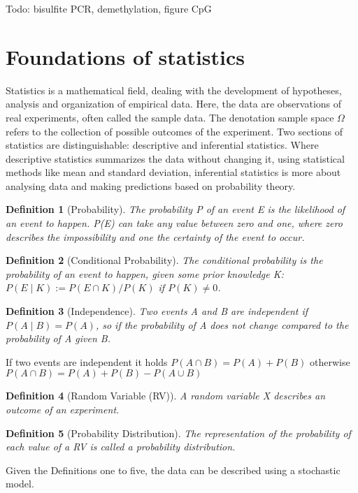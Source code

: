 Todo: bisulfite PCR, demethylation, figure CpG

\section{Foundations of statistics} 
\label{section:statistics}
Statistics is a mathematical field, dealing with the development of hypotheses, analysis and organization of empirical data. Here, the data are observations of real experiments, often called the sample data. The denotation sample space $\Omega$ refers to the collection of possible outcomes of the experiment.\cite{Philosophy} Two sections of statistics are distinguishable: descriptive and inferential statistics. Where descriptive statistics summarizes the data without changing it, using statistical methods like mean and standard deviation, inferential statistics is more about analysing data and making predictions based on probability theory.\cite{Introduction}\\
\newtheorem{definition}{Definition}
\begin{definition}[Probability]
The probability P of an event E is the likelihood of an event to happen. P(E) can take any value between zero and one, where zero describes the impossibility and one the certainty of the event to occur.
\end{definition}
\begin{definition}[Conditional Probability]
The conditional probability is the probability of an event to happen, given some prior knowledge K:\newline
$P(E \mid K) := P(E \cap K) / P(K)$ if $P(K) \neq 0$. 
\end{definition}
\begin{definition}[Independence]
Two events A and B are independent if $P(A \mid B) = P(A)$, so if the probability of A does not change compared to the probability of A given B.
\end{definition}
If two events are independent it holds $P(A \cap B) = P(A) + P(B)$ otherwise $P(A \cap B) = P(A) + P(B) - P(A \cup B)$
\begin{definition}[Random Variable (RV)]
A random variable X describes an outcome of an experiment.
\end{definition}
\begin{definition}[Probability Distribution]
The representation of the probability of each value of a \ac{RV} is called a probability distribution.
\end{definition}
Given the Definitions one to five, the data can be described using a stochastic model.


